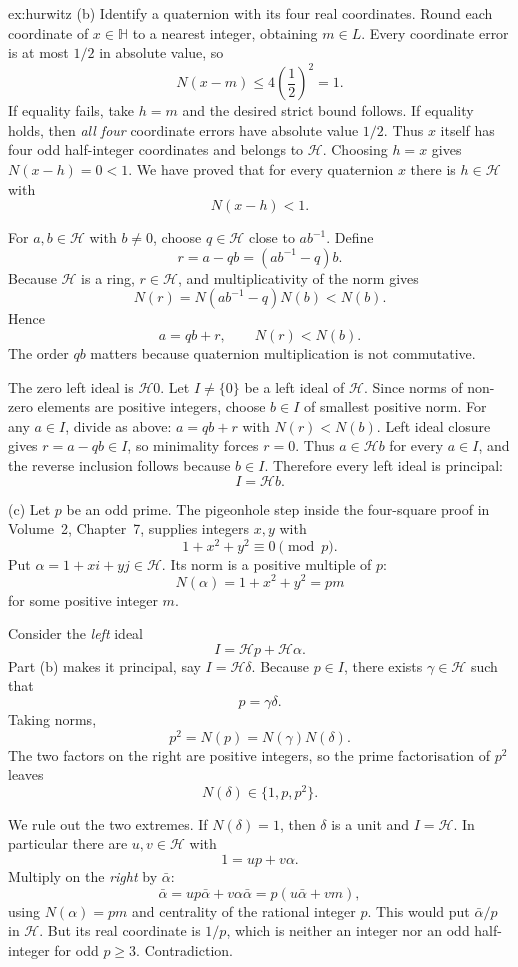 \begin{solution}{ex:hurwitz}
(b) Identify a quaternion with its four real coordinates. Round each coordinate of $x\in\mathbb H$ to a nearest integer, obtaining $m\in L$. Every coordinate error is at most $1/2$ in absolute value, so
\[
N(x-m)\le4\left(\frac12\right)^2=1.
\]
If equality fails, take $h=m$ and the desired strict bound follows. If equality holds, then \emph{all four} coordinate errors have absolute value $1/2$. Thus $x$ itself has four odd half-integer coordinates and belongs to $\mathcal H$. Choosing $h=x$ gives $N(x-h)=0<1$. We have proved that for every quaternion $x$ there is $h\in\mathcal H$ with
\[
\boxed{N(x-h)<1}.
\]

For $a,b\in\mathcal H$ with $b\ne0$, choose $q\in\mathcal H$ close to $ab^{-1}$. Define
\[
r=a-qb=(ab^{-1}-q)b.
\]
Because $\mathcal H$ is a ring, $r\in\mathcal H$, and multiplicativity of the norm gives
\[
N(r)=N(ab^{-1}-q)N(b)<N(b).
\]
Hence
\[
\boxed{a=qb+r,\qquad N(r)<N(b)}.
\]
The order $qb$ matters because quaternion multiplication is not commutative.

The zero left ideal is $\mathcal H0$. Let $I\ne\{0\}$ be a left ideal of $\mathcal H$. Since norms of non-zero elements are positive integers, choose $b\in I$ of smallest positive norm. For any $a\in I$, divide as above: $a=qb+r$ with $N(r)<N(b)$. Left ideal closure gives $r=a-qb\in I$, so minimality forces $r=0$. Thus $a\in\mathcal Hb$ for every $a\in I$, and the reverse inclusion follows because $b\in I$. Therefore every left ideal is principal:
\[
\boxed{I=\mathcal Hb}.
\]

(c) Let $p$ be an odd prime. The pigeonhole step inside the four-square proof in Volume~2, Chapter~7, supplies integers $x,y$ with
\[
1+x^2+y^2\equiv0\pmod p.
\]
Put $\alpha=1+xi+yj\in\mathcal H$. Its norm is a positive multiple of $p$:
\[
N(\alpha)=1+x^2+y^2=pm
\]
for some positive integer $m$.

Consider the \emph{left} ideal
\[
I=\mathcal Hp+\mathcal H\alpha.
\]
Part (b) makes it principal, say $I=\mathcal H\delta$. Because $p\in I$, there exists $\gamma\in\mathcal H$ such that
\[
p=\gamma\delta.
\]
Taking norms,
\[
p^2=N(p)=N(\gamma)N(\delta).
\]
The two factors on the right are positive integers, so the prime factorisation of $p^2$ leaves
\[
N(\delta)\in\{1,p,p^2\}.
\]

We rule out the two extremes. If $N(\delta)=1$, then $\delta$ is a unit and $I=\mathcal H$. In particular there are $u,v\in\mathcal H$ with
\[
1=up+v\alpha.
\]
Multiply on the \emph{right} by $\bar\alpha$:
\[
\bar\alpha=up\bar\alpha+v\alpha\bar\alpha
=p(u\bar\alpha+vm),
\]
using $N(\alpha)=pm$ and centrality of the rational integer $p$. This would put $\bar\alpha/p$ in $\mathcal H$. But its real coordinate is $1/p$, which is neither an integer nor an odd half-integer for odd $p\ge3$. Contradiction.


\end{solution}
